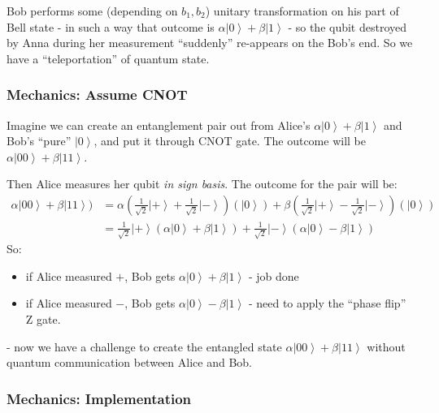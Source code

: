 \documentclass{scrartcl}
\newcommand{\ket}[1]{\left| #1 \right>} %
\begin{document}
Bob performs some (depending on $b_1, b_2$) unitary transformation on his part
of Bell state - in such a way that outcome is $\alpha\ket0 + \beta\ket1$ - so
the qubit destroyed by Anna during her measurement ``suddenly'' re-appears on
the Bob's end. So we have a ``teleportation'' of quantum state.


\subsubsection{Mechanics: Assume CNOT}
\label{sec:6-3-1}

Imagine we can create an entanglement pair out from Alice's $\alpha\ket0 +
\beta\ket1$ and Bob's ``pure'' $\ket0$, and put it through CNOT gate. The
outcome will be $\alpha\ket{00} + \beta\ket{11}$.

Then Alice measures her qubit {\it in sign basis}. The outcome for the pair will
be:
\[\begin{split}
  \alpha \ket{00} + \beta \ket{11}) &= \alpha\left(\frac1{\sqrt{2}}\ket+ +
    \frac1{\sqrt{2}}\ket-\right)(\ket0) +
  \beta\left(\frac1{\sqrt{2}}\ket+ - \frac1{\sqrt{2}}\ket-\right)(\ket0)  \\
  &= \frac1{\sqrt{2}}\ket+(\alpha\ket0 + \beta\ket1) +
  \frac1{\sqrt{2}}\ket-(\alpha\ket0 - \beta\ket1)
\end{split}\] So:
\begin{itemize}
\item if Alice measured $+$, Bob gets $\alpha\ket0 + \beta\ket1$ - job done
\item if Alice measured $-$, Bob gets $\alpha\ket0 - \beta\ket1$ - need to apply
  the ``phase flip'' Z gate.
\end{itemize}
- now we have a challenge to create the entangled state $\alpha\ket{00} +
\beta\ket{11}$ without quantum communication between Alice and Bob.

\subsubsection{Mechanics: Implementation}
\label{sec:6-4}
\end{document}
